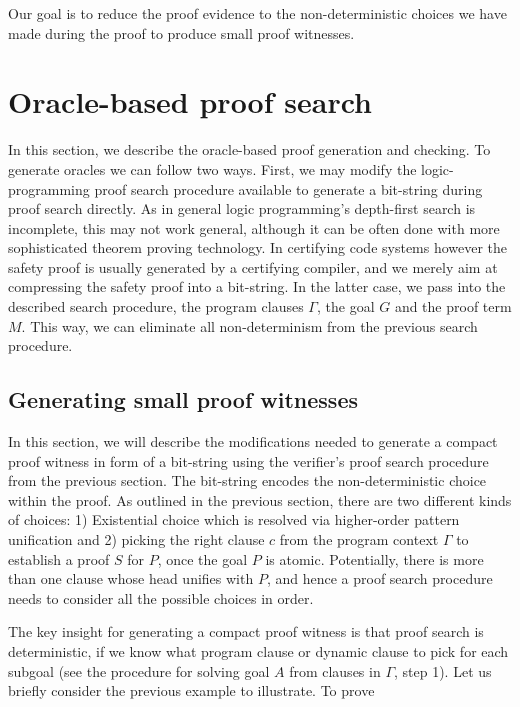 \documentclass{acmconf}
\begin{document}
 Our goal is to reduce the proof evidence to the
non-deterministic choices we have made during the proof to produce
small proof witnesses.  
      
\section{Oracle-based proof search}
\label{sec:oracles}

In this section, we describe the oracle-based proof generation and
checking. To generate oracles we can follow two ways. First, we may
modify the logic-programming proof search procedure available to generate
a bit-string during proof search directly. As in general logic
programming's depth-first search is incomplete, this may not work
general, although it can be often done with more sophisticated theorem
proving  technology. In certifying code systems however the safety proof is
usually generated by a certifying compiler, and we merely aim at
compressing the safety proof into a bit-string. In the latter case, we
pass into the described search procedure, the program clauses
$\Gamma$, the goal $G$ and the proof term $M$. This way, we can
eliminate all non-determinism from the previous search procedure.

\subsection{Generating small proof witnesses}

In this section, we will describe the modifications needed to generate
a compact proof witness in form of a bit-string using the verifier's
proof search procedure from the previous section. The bit-string
encodes the non-deterministic choice within the proof. As outlined in
the previous section, there are two different kinds of choices: 1)
Existential choice which is resolved via higher-order pattern
unification and 2) picking the right clause $c$ from the
program context $\Gamma$ to establish a proof $S$ for $P$, once the
goal $P$ is atomic. Potentially, there is more than one clause whose head
unifies with $P$, and hence a proof search procedure needs to consider
all the possible choices in order.  

The key insight for generating a compact proof witness is that proof
search is deterministic, if we know what program clause or dynamic
clause to pick for each subgoal (see the procedure for solving goal
$A$ from clauses in $\Gamma$, step 1). Let us briefly consider the
previous example to illustrate. To prove
\end{document}
